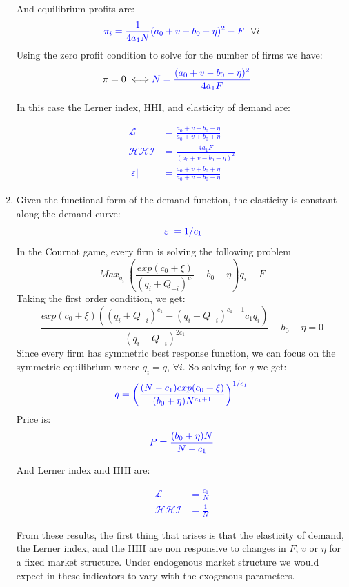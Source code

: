 \documentclass[11pt,english]{article}
\begin{document}
\begin{enumerate}
And equilibrium profits are:
\[
\textcolor{blue}{\pi_{i}=\frac{1}{4a_{1}N}(a_{0}+v-b_{0}-\eta)^{2}-F}\ \ \forall i
\]
Using the zero profit condition to solve for the number of firms we have:
\begin{align}
\pi=0\iff &\textcolor{blue}{N=\frac{(a_{0}+v-b_{0}-\eta)^{2}}{4a_{1}F}}\nonumber
\end{align}

In this case the Lerner index, HHI, and elasticity of demand are:

\textcolor{blue}{
\begin{align}
\mathcal{L}&=\frac{a_{0}+v-b_{0}-\eta}{a_{0}+v+b_{0}+\eta}\nonumber\\
\mathcal{HHI}&=\frac{4a_{1}F}{(a_{0}+v-b_{0}-\eta)^{2}}\nonumber\\
|\varepsilon|&=\frac{a_{0}+v+b_{0}+\eta}{a_{0}+v-b_{0}-\eta}\nonumber
\end{align}}

\item Given the functional form of the demand function, the elasticity is constant along the demand curve:
\[
\textcolor{blue}{|\varepsilon|=1/c_{1}}
\]
In the Cournot game, every firm is solving the following problem
\[
Max_{q_{i}}\ \left(\frac{exp(c_{0}+\xi)}{(q_{i}+Q_{-i})^{c_{1}}} -b_{0}-\eta\right)q_{i}-F
\]
Taking the first order condition, we get:
\[
\frac{exp(c_{0}+\xi)((q_{i}+Q_{-i})^{c_{1}}-(q_{i}+Q_{-i})^{c_{1}-1}c_{1}q_{i})}{(q_{i}+Q_{-i})^{2c_{1}}}-b_{0}-\eta=0
\]
Since every firm has symmetric best response function, we can focus on the symmetric equilibrium where $q_{i}=q$, $\forall i$. So solving for $q$ we get:
\[
\textcolor{blue}{q=\left(\frac{(N-c_{1})exp(c_{0}+\xi)}{(b_{0}+\eta)N^{c_{1}+1}}\right)^{1/c_{1}}}
\]
Price is:
\[
\textcolor{blue}{P=\frac{(b_{0}+\eta)N}{N-c_{1}}}
\]

And Lerner index and HHI are:

\textcolor{blue}{
\begin{align}
\mathcal{L}&=\frac{c_{1}}{N}\nonumber\\
\mathcal{HHI}&=\frac{1}{N}\nonumber
\end{align}}

From these results, the first thing that arises is that the elasticity of demand, the Lerner index, and the HHI are non responsive to changes in $F$, $v$ or $\eta$ for a fixed market structure.  Under endogenous market structure we would expect in these indicators to vary with the exogenous parameters.
\end{enumerate}
\end{document}
